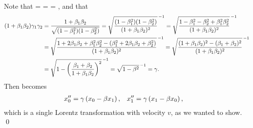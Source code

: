 \begin{solution}
	Note that
	\beq
		 =  
		= 
		= \bet,
	\eeq
	and that
	\begin{align*}
		(1 + \beta_1 \beta_2) \gamma_1 \gamma_2 &= \frac{1 + \beta_1 \beta_2}{\sqrt{(1 - \beta_1^2) (1 - \beta_2^2)}}
		= \sqrt{\frac{(1 - \beta_1^2) (1 - \beta_2^2)}{(1 + \beta_1 \beta_2)^2}}^{\,-1}
		= \sqrt{\frac{1 - \beta_1^2 - \beta_2^2 + \beta_1^2 \beta_2^2}{(1 + \beta_1 \beta_2)^2}}^{\,-1} \\
		&= \sqrt{\frac{1 + 2 \beta_1 \beta_2 + \beta_1^2 \beta_2^2 - (\beta_1^2 + 2 \beta_1 \beta_2 + \beta_2^2)}{(1 + \beta_1 \beta_2)^2}}^{\,-1}
		= \sqrt{\frac{(1 + \beta_1 \beta_2)^2 - (\beta_1 + \beta_2)^2}{(1 + \beta_1 \beta_2)^2}}^{\,-1} \\
		&= \sqrt{1 - \left( \frac{\beta_1 + \beta_2}{1 + \beta_1 \beta_2} \right)^2}^{\,-1}
		= \sqrt{1 - \beta^2}^{\,-1}
		= \gamma.
	\end{align*}
	Then  becomes
	\begin{align*}
		x_0'' &= \gamma \left( x_0 - \beta x_1 \right), &
		x_1'' &= \gamma \left( x_1 - \beta x_0 \right),
	\end{align*}
	which is a single Lorentz transformation with velocity $v$, as we wanted to show. \qed
\end{solution}